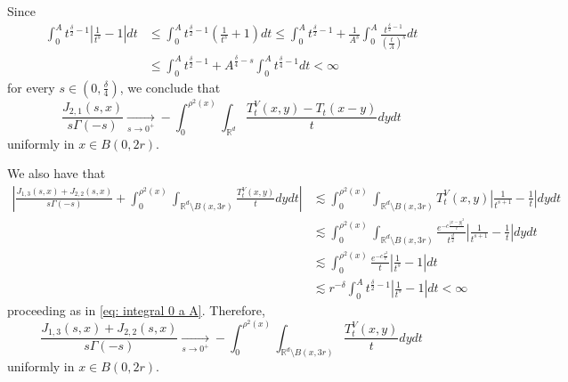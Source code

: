 \documentclass[10pt, a4paper, reqno]{amsart}
\theoremstyle{definition}
\theoremstyle{remark}
\newcommand{\RR}{\mathbb{R}}
\numberwithin{equation}{section}
\begin{document}
Since 
\begin{align}\label{eq: integral 0 a A}
    \int_0^{A} t^{\frac{\delta}{2}-1}\left|\frac{1}{t^{s}}-1\right|dt& \leq \int_0^{A} t^{\frac{\delta}{2}-1}\left(\frac{1}{t^{s}}+1\right)dt\leq \int_0^{A} t^{\frac{\delta}{2}-1}+\frac{1}{A^s}\int_0^{A} \frac{t^{\frac{\delta}{2}-1}}{\left(\frac{t}{A}\right)^{s}}dt\nonumber\\
    &\leq \int_0^{A} t^{\frac{\delta}{2}-1}+A^{\frac{\delta}{4}-s}\int_0^{A} t^{\frac{\delta}{4}-1} dt <\infty
\end{align}
for every $s\in (0,\frac{\delta}{4})$, we conclude that
\begin{equation}\label{eq: lim J21}
    \frac{J_{2,1}(s,x)}{s\Gamma(-s)}\underset{s\to 0^+}{\longrightarrow} -\int_0^{\rho^2(x)} \int_{\RR^d} \frac{T_t^V(x,y)-T_t(x-y)}{t}dydt
\end{equation}
uniformly in $x\in B(0,2r)$.

We also have that 
\begin{align*}
    \left|\frac{J_{1,3}(s,x)+J_{2,2}(s,x)}{s\Gamma(-s)}+\int_0^{\rho^2(x)}\int_{\RR^d\setminus B(x,3r)}\frac{T_t^V(x,y)}{t}dydt\right|&\lesssim \int_0^{\rho^2(x)}\int_{\RR^d\setminus B(x,3r)}T_t^V(x,y)\left|\frac{1}{t^{s+1}}-\frac1t\right|dydt\\
    &\lesssim \int_0^{\rho^2(x)}\int_{\RR^d\setminus B(x,3r)}\frac{e^{-c\frac{|x-y|^2}{t}}}{t^{\frac d2}}\left|\frac{1}{t^{s+1}}-\frac1t\right|dydt\\
    &\lesssim \int_0^{\rho^2(x)}\frac{e^{-c\frac{r^2}{t}}}{t}\left|\frac{1}{t^{s}}-1\right|dt\\
    &\lesssim r^{-\delta}\int_0^A t^{\frac{\delta}{2}-1}\left|\frac{1}{t^{s}}-1\right|dt<\infty
\end{align*}
proceeding as in \eqref{eq: integral 0 a A}. Therefore,
\begin{equation}\label{eq: lim J13+J22}
    \frac{J_{1,3}(s,x)+J_{2,2}(s,x)}{s\Gamma(-s)}\underset{s\to 0^+}{\longrightarrow}-\int_0^{\rho^2(x)}\int_{\RR^d\setminus B(x,3r)}\frac{T_t^V(x,y)}{t}dydt
\end{equation}
uniformly in $x\in B(0,2r)$.
\end{document}
